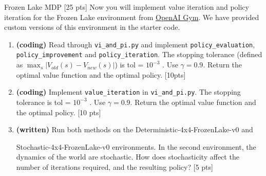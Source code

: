 \documentclass[11pt]{article}
\begin{document}
\begin{tcolorbox}[breakable]




\end{tcolorbox}


\newpage

\begin{section}{Frozen Lake MDP [25 pts]}
Now you will implement value iteration and policy iteration for the Frozen Lake environment
from \href{"https://gym.openai.com/envs/FrozenLake-v0"}{OpenAI Gym}. We have provided
custom versions of this environment in the starter code.
\begin{enumerate}[label=(\alph*)]
\item \textbf{(coding)} Read through \texttt{vi\_and\_pi.py} and implement \texttt{policy\_evaluation}, \texttt{policy\_improvement} and \texttt{policy\_iteration}. The stopping tolerance (defined as $\max_s |V_{old}(s) - V_{new}(s)|$) is tol = $10^{-3}$
. Use $\gamma = 0.9$. Return the optimal value function and the optimal policy. [10pts]
\item \textbf{(coding)} Implement \texttt{value\_iteration} in \texttt{vi\_and\_pi.py}. The stopping tolerance is tol =
$10^{-3}$
. Use $\gamma = 0.9$. Return the optimal value function and the optimal policy. [10 pts]
\item \textbf{(written)} Run both methods on the Deterministic-4x4-FrozenLake-v0 and

Stochastic-4x4-FrozenLake-v0 environments. In the second environment, the dynamics of the world are stochastic. How does stochasticity affect the number of iterations required, and the resulting policy? [5 pts]

\end{enumerate}
\end{section}

\begin{tcolorbox}[breakable]



\end{tcolorbox}
\end{document}
